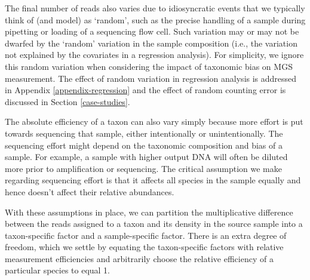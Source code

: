 \documentclass[
]{article}
\begin{document}
The final number of reads also varies due to idiosyncratic events that we typically think of (and model) as `random', such as the precise handling of a sample during pipetting or loading of a sequencing flow cell.
Such variation may or may not be dwarfed by the `random' variation in the sample composition (i.e., the variation not explained by the covariates in a regression analysis).
For simplicity, we ignore this random variation when considering the impact of taxonomic bias on MGS measurement.
The effect of random variation in regression analysis is addressed in Appendix \ref{appendix-regression} and the effect of random counting error is discussed in Section \ref{case-studies}.

The absolute efficiency of a taxon can also vary simply because more effort is put towards sequencing that sample, either intentionally or unintentionally.
The sequencing effort might depend on the taxonomic composition and bias of a sample.
For example, a sample with higher output DNA will often be diluted more prior to amplification or sequencing.
The critical assumption we make regarding sequencing effort is that it affects all species in the sample equally and hence doesn't affect their relative abundances.

With these assumptions in place, we can partition the multiplicative difference between the reads assigned to a taxon and its density in the source sample into a taxon-specific factor and a sample-specific factor.
There is an extra degree of freedom, which we settle by equating the taxon-specific factors with relative measurement efficiencies and arbitrarily choose the relative efficiency of a particular species to equal 1.
\end{document}
